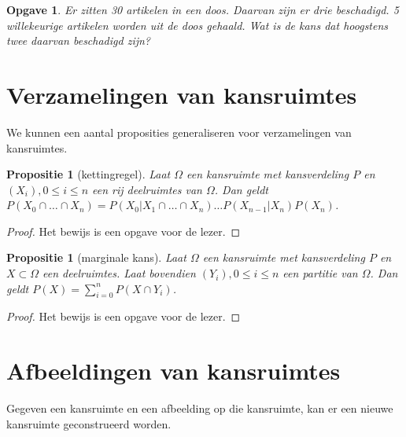 \documentclass[a4paper]{book}
\newtheorem{proposition}[theorem]{Propositie}
\newtheorem{exercise}[theorem]{Opgave}
\theoremstyle{definition}
\begin{document}
\begin{exercise}
Er zitten 30 artikelen in een doos. Daarvan zijn er drie beschadigd.
5 willekeurige artikelen worden uit de doos gehaald. Wat is de kans dat hoogstens twee daarvan beschadigd zijn?
\end{exercise}


\section{Verzamelingen van kansruimtes}
We kunnen een aantal proposities generaliseren voor verzamelingen van kansruimtes.

\begin{proposition}[kettingregel]
    Laat $\Omega$ een kansruimte met kansverdeling $P$ en $(X_i), 0 \leq i \leq n$ een rij deelruimtes van $\Omega$.
    Dan geldt $P(X_0 \cap \dots \cap X_n) = P(X_0|X_1 \cap \dots \cap X_n) \dots P(X_{n-1}|X_n)P(X_n)$.
\end{proposition}
\begin{proof}
    Het bewijs is een opgave voor de lezer.
\end{proof}

\begin{proposition}[marginale kans]
    Laat $\Omega$ een kansruimte met kansverdeling $P$ en $X \subset \Omega$ een deelruimtes.
    Laat bovendien $(Y_i), 0 \leq i \leq n$ een partitie van $\Omega$.
    Dan geldt $P(X) = \sum_{i=0}^n P(X \cap Y_i)$.
\end{proposition}
\begin{proof}
    Het bewijs is een opgave voor de lezer.
\end{proof}


\section{Afbeeldingen van kansruimtes}
Gegeven een kansruimte en een afbeelding op die kansruimte, kan er een nieuwe kansruimte geconstrueerd worden.
\end{document}
